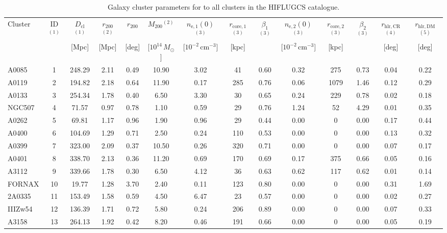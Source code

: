 \documentclass[10pt,aps,pra,reprint,amsmath,amsfonts,amssymb,showpacs,nofootinbib,floatfix]{revtex4-1}
\newcommand{\rmn}{\mathrm}
\newcommand{\clu}{\rmn{cl}}
\newcommand{\msun}{M_\odot}
\newcommand{\vst}{\vspace{-0.14mm}}
\newcommand{\rvir}{r_{200}}
\newcommand{\mvir}{M_{200}}
\begin{document}
\begin{table}
\begin{minipage}{2.0\columnwidth}
  \caption{Galaxy cluster parameters for to all clusters in the HIFLUGCS catalogue.}
\begin{tabular}{l c c c c c c c c c c c c c}
\hline
\hline
Cluster & ID$^{(1)}$ & $D_\clu$$^{(1)}$ & $\rvir$$^{(2)}$ & $\rvir$ &
$\mvir$$^{(2)}$ & $n_\rmn{e,1}(0)$$^{(3)}$ & $r_\rmn{core,1}$$^{(3)}$ &
$\beta_1$$^{(3)}$ & $n_\rmn{e,2}(0)$$^{(3)}$ & $r_\rmn{core,2}$$^{(3)}$ &
$\beta_2$$^{(3)}$ & $r_\rmn{hlr,CR}$$^{(4)}$ & $r_\rmn{hlr,DM}$ $^{(5)}$ \\
& & [Mpc] & [Mpc] & [deg] & [$10^{14}\,\msun$]
& [$10^{-2}\,\rmn{cm}^{-3}$] & [kpc] & &
  [$10^{-2}\,\rmn{cm}^{-3}$] & [kpc] & & [deg] & [deg] \\
 \hline
A0085 & 1 & 248.29 & 2.11 & 0.49 & 10.90 & 3.02 & 41 & 0.60 & 0.32 & 275 & 0.73 & 0.04 & 0.22 \vst \\
A0119 & 2 & 194.82 & 2.18 & 0.64 & 11.90 & 0.17 & 285 & 0.76 & 0.06 & 1079 & 1.46 & 0.12 & 0.29 \vst \\
A0133 & 3 & 254.34 & 1.78 & 0.40 & 6.50 & 3.30 & 30 & 0.65 & 0.24 & 229 & 0.78 & 0.02 & 0.18 \vst \\
NGC507 & 4 & 71.57 & 0.97 & 0.78 & 1.10 & 0.59 & 29 & 0.76 & 1.24 & 52 & 4.29 & 0.01 & 0.35 \vst \\
A0262 & 5 & 69.81 & 1.17 & 0.96 & 1.90 & 0.96 & 29 & 0.44 & 0.00 & 0 & 0.00 & 0.17 & 0.44 \vst \\
A0400 & 6 & 104.69 & 1.29 & 0.71 & 2.50 & 0.24 & 110 & 0.53 & 0.00 & 0 & 0.00 & 0.13 & 0.32 \vst \\
A0399 & 7 & 323.00 & 2.09 & 0.37 & 10.50 & 0.26 & 320 & 0.71 & 0.00 & 0 & 0.00 & 0.07 & 0.17 \vst \\
A0401 & 8 & 338.70 & 2.13 & 0.36 & 11.20 & 0.69 & 170 & 0.69 & 0.17 & 375 & 0.66 & 0.05 & 0.16 \vst \\
A3112 & 9 & 339.66 & 1.78 & 0.30 & 6.50 & 4.12 & 36 & 0.63 & 0.62 & 117 & 0.62 & 0.01 & 0.14 \vst \\
FORNAX & 10 & 19.77 & 1.28 & 3.70 & 2.40 & 0.11 & 123 & 0.80 & 0.00 & 0 & 0.00 & 0.31 & 1.69 \vst \\
2A0335 & 11 & 153.49 & 1.58 & 0.59 & 4.50 & 6.47 & 23 & 0.57 & 0.00 & 0 & 0.00 & 0.02 & 0.27 \vst \\
IIIZw54 & 12 & 136.39 & 1.71 & 0.72 & 5.80 & 0.24 & 206 & 0.89 & 0.00 & 0 & 0.00 & 0.07 & 0.33 \vst \\
A3158 & 13 & 264.13 & 1.92 & 0.42 & 8.20 & 0.46 & 191 & 0.66 & 0.00 & 0 & 0.00 & 0.05 & 0.19 \vst \\

\end{tabular}
\end{minipage}
\end{table}
\end{document}
